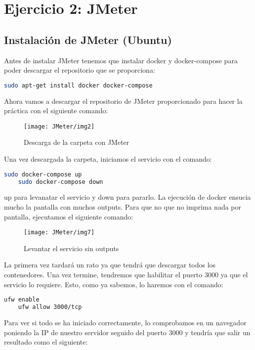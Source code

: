 \newpage
\section{Ejercicio 2: JMeter}

\subsection{Instalación de JMeter (Ubuntu)}

Antes de instalar JMeter tenemos que instalar docker y docker-compose para poder descargar el repositorio que se proporciona:

\begin{lstlisting}[language=bash]
    sudo apt-get install docker docker-compose
\end{lstlisting}

Ahora vamos a descargar el repositorio de JMeter proporcionado para hacer la práctica con el siguiente comando:

\begin{figure}[H]
    \centering
    \texttt{[image: JMeter/img2]}
    \caption{Descarga de la carpeta con JMeter}
\end{figure}

Una vez descargada la carpeta, iniciamos el servicio con el comando:

\begin{lstlisting}[language=bash]
    sudo docker-compose up
    sudo docker-compose down
\end{lstlisting}

up para levanatar el servicio y down para pararlo. La ejecución de docker ensucia mucho la pantalla con muchos outputs. Para que no 
que no imprima nada por pantalla, ejecutamos el siguiente comando:

\begin{figure}[H]
    \centering
    \texttt{[image: JMeter/img7]}
    \caption{Levantar el servicio sin outputs}
\end{figure}

La primera vez tardará un rato ya que tendrá que descargar todos los contenedores. Una vez termine, tendremos que habilitar el puerto 3000 ya que el servicio lo requiere.
Esto, como ya sabemos, lo haremos con el comando:

\begin{lstlisting}[language=bash]
    ufw enable
    ufw allow 3000/tcp    
\end{lstlisting}

Para ver si todo se ha iniciado correctamente, lo comprobamos en un navegador poniendo la IP de nuestro servidor seguido del puerto 3000 y tendría que salir un resultado como el siguiente:

